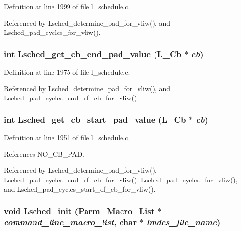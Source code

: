 Definition at line 1999 of file l\_\-schedule.c.

Referenced by Lsched\_\-determine\_\-pad\_\-for\_\-vliw(), and Lsched\_\-pad\_\-cycles\_\-for\_\-vliw().
\subsubsection{\setlength{\rightskip}{0pt plus 5cm}int Lsched\_\-get\_\-cb\_\-end\_\-pad\_\-value (L\_\-Cb $\ast$ {\em cb})}\label{l__schedule_8c_497f05aa980592a2e1edbdd0fbfaee76}




Definition at line 1975 of file l\_\-schedule.c.

Referenced by Lsched\_\-determine\_\-pad\_\-for\_\-vliw(), and Lsched\_\-pad\_\-cycles\_\-end\_\-of\_\-cb\_\-for\_\-vliw().
\subsubsection{\setlength{\rightskip}{0pt plus 5cm}int Lsched\_\-get\_\-cb\_\-start\_\-pad\_\-value (L\_\-Cb $\ast$ {\em cb})}\label{l__schedule_8c_8df7af51ac5aa60f63d83ae7d6989db6}




Definition at line 1951 of file l\_\-schedule.c.

References NO\_\-CB\_\-PAD.

Referenced by Lsched\_\-determine\_\-pad\_\-for\_\-vliw(), Lsched\_\-pad\_\-cycles\_\-end\_\-of\_\-cb\_\-for\_\-vliw(), Lsched\_\-pad\_\-cycles\_\-for\_\-vliw(), and Lsched\_\-pad\_\-cycles\_\-start\_\-of\_\-cb\_\-for\_\-vliw().
\subsubsection{\setlength{\rightskip}{0pt plus 5cm}void Lsched\_\-init (\bf{Parm\_\-Macro\_\-List} $\ast$ {\em command\_\-line\_\-macro\_\-list}, char $\ast$ {\em lmdes\_\-file\_\-name})}\label{l__schedule_8c_a55aae15093dd030630975c50933ac30}




